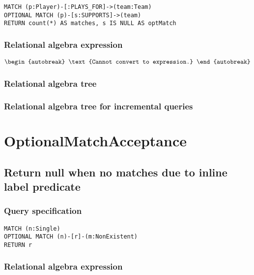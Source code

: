 \begin{lstlisting}
MATCH (p:Player)-[:PLAYS_FOR]->(team:Team)
OPTIONAL MATCH (p)-[s:SUPPORTS]->(team)
RETURN count(*) AS matches, s IS NULL AS optMatch
\end{lstlisting}

\subsubsection*{Relational algebra expression}

\begin{align*}
\begin{autobreak}
\text{Cannot convert to expression.}
\end{autobreak}
\end{align*}

\subsubsection*{Relational algebra tree}


\subsubsection*{Relational algebra tree for incremental queries}

\section{OptionalMatchAcceptance}


\subsection{Return null when no matches due to inline label predicate}

\subsubsection*{Query specification}

\begin{lstlisting}
MATCH (n:Single)
OPTIONAL MATCH (n)-[r]-(m:NonExistent)
RETURN r
\end{lstlisting}

\subsubsection*{Relational algebra expression}

